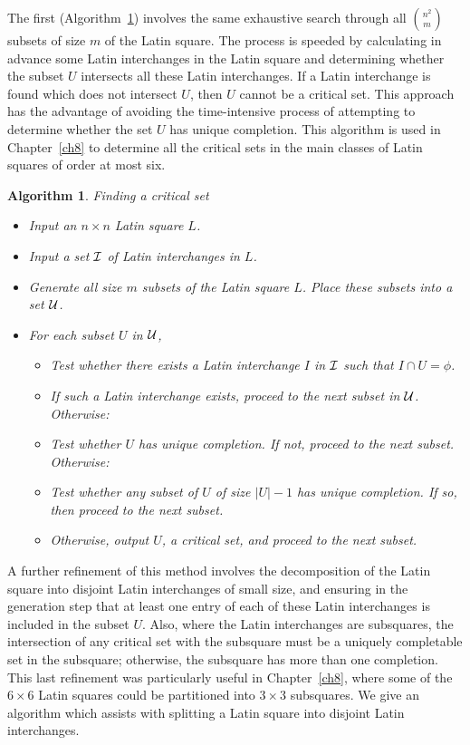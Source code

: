 \documentclass[12pt]{report}
\newtheorem{algorithm}{Algorithm}
\begin{document}
The first (Algorithm~\ref{311}) involves the same exhaustive search
through all %
$\displaystyle{\binom{n^2}{m}}$ subsets of size $m$ of the Latin square.  The process
is speeded by calculating in advance some Latin interchanges in the
Latin square and determining whether the subset $U$ intersects all these Latin
interchanges.  If a Latin interchange is found which does not intersect
$U$, then $U$ cannot be a critical set.  This approach has the advantage of
avoiding the time-intensive process of attempting to determine whether
the set $U$ has unique completion.  This algorithm is used in Chapter~\ref{ch8}
to determine all the critical sets in the main classes of Latin squares
of order at most six.
\newpage
\begin{algorithm}{Finding a critical set}
\label{311}
\begin{itemize}
\item Input an $n \times n$ Latin square $L$.
\item Input a set $\cal{I}$ of Latin interchanges in $L$.
\item Generate all size $m$ subsets of the Latin square $L$.  Place these subsets into a set $\cal{U}$.
\item For each subset $U$ in $\cal{U}$,
\begin{itemize}
\item Test whether there exists a Latin interchange $I$ in $\cal{I}$ such that $I \cap U = \phi$.
\item If such a Latin interchange exists, proceed to the next subset in $\cal{U}$.  Otherwise:
\item Test whether $U$ has unique completion.  If not, proceed to the next subset.  Otherwise:
\item Test whether any subset of $U$ of size $|U|-1$ has unique completion.  If so, then proceed to the next subset.
\item Otherwise, output $U$, a critical set, and proceed to the next subset.
\end{itemize}
\end{itemize}
\end{algorithm}

A further refinement of this method involves the decomposition of the
Latin square into disjoint Latin interchanges of small size, and ensuring in the generation step that at least one
entry of each of these Latin interchanges is included in the subset $U$.
Also, where the Latin interchanges are subsquares,
the intersection of any critical set with the subsquare must be a uniquely
completable set in the subsquare; otherwise, the subsquare 
has more than one completion.
This last refinement was particularly useful in Chapter~\ref{ch8}, where some of
the $6 \times 6$ Latin squares could be partitioned into
$3 \times 3$ subsquares.  We give an algorithm which assists with
splitting a Latin square into disjoint Latin interchanges.
\end{document}
